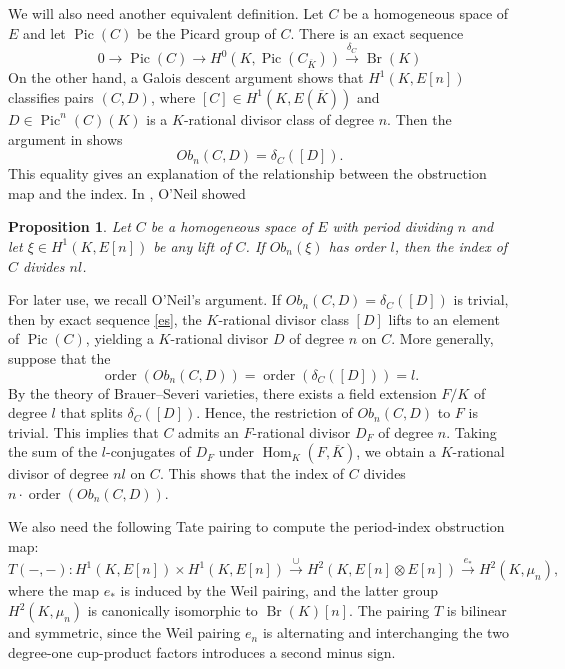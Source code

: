 \documentclass[11pt,a4paper]{amsart}
\newtheorem{proposition}[theorem]{Proposition}
\theoremstyle{definition}
\newcommand{\Br}{\operatorname{Br}}
\newcommand{\Pic}{\operatorname{Pic}}
\numberwithin{equation}{section}
\begin{document}
We will also need another equivalent definition. Let $C$ be a homogeneous space of $E$ and let $\operatorname{Pic}(C)$ be the Picard group of $C$. There is an exact sequence \cite[Section 3.1]{clark}
\begin{equation}\label{es}
	0\rightarrow \operatorname{Pic}(C)\rightarrow H^0(K,\operatorname{Pic}(C_{\overline{K}}))\xrightarrow{\delta_C} \Br(K)
\end{equation}
On the other hand, a Galois descent argument \cite[Proposition 1.9]{CFOSS1} shows that $H^1(K,E[n])$ classifies pairs $(C,D)$, where $[C]\in H^1(K,E(\overline{K}))$ and $D\in \Pic^n(C)(K)$ is a $K$-rational divisor class of degree $n$. Then the argument in  \cite[Section 3.1]{clark} shows
\[
Ob_n(C,D)=\delta_C([D]).
\]
This equality gives an explanation of the relationship between the obstruction map and the index. In \cite{ONeil}, O'Neil showed
\begin{proposition}\label{neil}
	 Let $C$ be  a homogeneous space of $E$ with period dividing $n$ and let $\xi\in H^1(K,E[n])$ be any lift of $C$. If $Ob_n(\xi)$ has order $l$, then the index of $C$ divides $nl$.
\end{proposition}
  For later use, we recall O'Neil's argument. If  $Ob_n(C,D)=\delta_C([D])$ is trivial, then by exact sequence \eqref{es}, the $K$-rational divisor class $[D]$ lifts to an element of $\Pic(C)$, yielding a $K$-rational divisor $D$ of degree $n$ on $C$. More generally, suppose that the 
\[
\operatorname{order}(Ob_n(C,D))=\operatorname{order}(\delta_C([D]))=l.
\]
By the theory of Brauer--Severi varieties, there exists a field extension
\(F/K\) of degree \(l\) that splits \(\delta_C([D])\). Hence, the restriction
of \(Ob_n(C,D)\) to \(F\) is trivial. This implies that \(C\) admits an
\(F\)-rational divisor \(D_F\) of degree \(n\). Taking the sum of the $l$-conjugates of $D_F$ under $\operatorname{Hom}_K(F,\overline{K})$, we obtain a $K$-rational divisor of degree $nl$ on $C$. This shows that the index of $C$ divides $n\cdot \operatorname{order}(Ob_n(C,D))$.
   
 We also need the following Tate pairing to compute the period-index
 obstruction map:
 \begin{equation}
 	T(-,-): H^1(K,E[n])\times H^1(K,E[n])
 	\xrightarrow{\cup}
 	H^2(K,E[n]\otimes E[n])
 	\xrightarrow{e_*}
 	H^2(K,\mu_n),
 \end{equation}
 where the map \(e_*\) is induced by the Weil pairing, and the latter
 group \(H^2(K,\mu_n)\) is canonically isomorphic to \(\Br(K)[n]\). The pairing \(T\) is bilinear and symmetric, since the Weil pairing \(e_n\) is alternating and interchanging the two degree-one cup-product factors introduces a second minus sign.
 
\end{document}
